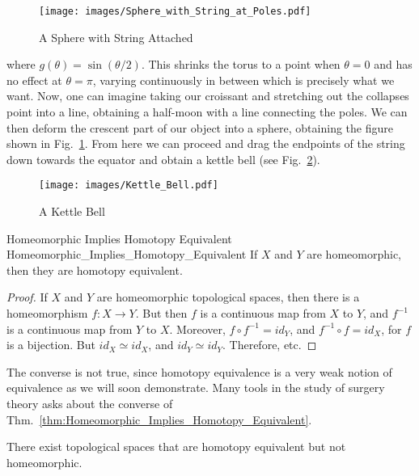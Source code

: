 \documentclass{article}                                                        %
\begin{document}
        \begin{figure}[H]
            \centering
            \captionsetup{type=figure}
            \texttt{[image: images/Sphere\_with\_String\_at\_Poles.pdf]}
            \caption{A Sphere with String Attached}
            \label{fig:Sphere_with_String_Attached}
        \end{figure}
        where $g(\theta)=\sin(\theta/2)$. This shrinks the torus to a point when
        $\theta=0$ and has no effect at $\theta=\pi$, varying continuously in
        between which is precisely what we want. Now, one can imagine taking
        our croissant and stretching out the collapses point into a line,
        obtaining a half-moon with a line connecting the poles. We can then
        deform the crescent part of our object into a sphere, obtaining the
        figure shown in Fig.~\ref{fig:Sphere_with_String_Attached}. From here we
        can proceed and drag the endpoints of the string down towards the
        equator and obtain a kettle bell (see Fig.~\ref{fig:Kettle_Bell}).
        \begin{figure}[H]
            \centering
            \captionsetup{type=figure}
            \texttt{[image: images/Kettle\_Bell.pdf]}
            \caption{A Kettle Bell}
            \label{fig:Kettle_Bell}
        \end{figure}
        \begin{ltheorem}{Homeomorphic Implies Homotopy Equivalent}
                        {Homeomorphic_Implies_Homotopy_Equivalent}
            If $X$ and $Y$ are homeomorphic, then they are homotopy equivalent.
        \end{ltheorem}
        \begin{proof}
            If $X$ and $Y$ are homeomorphic topological spaces, then there
            is a homeomorphism $f:X\rightarrow Y$. But then $f$ is a
            continuous map from $X$ to $Y$, and $f^{-1}$ is a continuous
            map from $Y$ to $X$. Moreover, ${f}\circ{f^{-1}}=id_{Y}$, and
            ${f^{-1}}\circ{f}=id_{X}$, for $f$ is a bijection. But
            ${id_{X}}\simeq{id_{X}}$, and ${id_{Y}}\simeq{id_{Y}}$.
            Therefore, etc.
        \end{proof}
        The converse is not true, since homotopy equivalence is a very weak
        notion of equivalence as we will soon demonstrate. Many tools in the
        study of surgery theory asks about the converse of
        Thm.~\ref{thm:Homeomorphic_Implies_Homotopy_Equivalent}.
        \begin{theorem}
            \label{thm:homotopic_does_not_imply_homeomorphic}%
            There exist topological spaces that are homotopy equivalent but not
            homeomorphic.
        \end{theorem}
\end{document}
